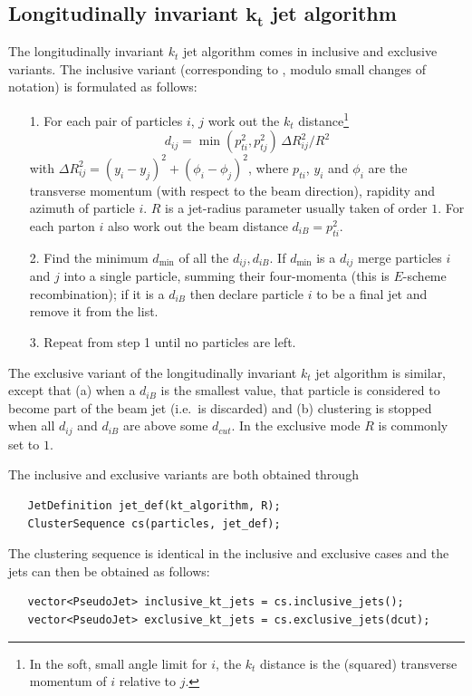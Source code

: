 \documentclass[12pt,a4]{article}
\begin{document}
\subsection[Longitudinally invariant $k_t$ jet algorithm]{Longitudinally invariant $\boldsymbol{k_t}$ jet algorithm}
%
The longitudinally invariant $k_t$ jet algorithm \cite{ktexcl,ktincl}
comes in inclusive and exclusive variants.
%
The inclusive variant (corresponding to \cite{ktincl}, modulo small
changes of notation) is formulated as follows:
\begin{itemize}
\item[1.] For each pair of particles $i$, $j$ work out the $k_t$
  distance\footnote{In the soft, small angle limit for $i$, the $k_t$
    distance is the (squared) transverse momentum of $i$ relative to $j$.}
  \begin{equation}
    \label{eq:dij}
    d_{ij} = \min(p_{ti}^2,{p_{tj}^2}) \, \Delta R_{ij}^2 / R^2
  \end{equation}
  with $\Delta R_{ij}^2 = (y_i-y_j)^2 + (\phi_i-\phi_j)^2$,
  where $p_{ti}$, $y_i$ and $\phi_i$ are the transverse momentum (with
  respect to the beam direction),
  rapidity and azimuth of particle $i$. $R$ is a jet-radius
  parameter usually taken of order $1$. For each parton $i$ also work
  out the beam distance $d_{iB} = p_{ti}^2$.
\item[2.] Find the minimum $d_{\min}$ of all the $d_{ij},d_{iB}$. If
  $d_{\min}$ is a $d_{ij}$ merge particles $i$ and $j$ into a single
  particle, summing their four-momenta (this is $E$-scheme
  recombination); if it is a $d_{iB}$ then declare particle $i$ to be
  a final jet and remove it from the list.
\item[3.] Repeat from step 1 until no particles are left.
\end{itemize}
The exclusive variant of the longitudinally invariant $k_t$ jet
algorithm \cite{ktexcl} is similar, except that (a) when a $d_{iB}$ is
the smallest value, that particle is considered to become part of the
beam jet (i.e.\ is discarded) and (b) clustering is stopped when all
$d_{ij}$ and $d_{iB}$ are above some $d_{cut}$. In the exclusive mode
$R$ is commonly set to $1$.

The inclusive and exclusive variants are both obtained through 
\begin{lstlisting}
   JetDefinition jet_def(kt_algorithm, R);
   ClusterSequence cs(particles, jet_def);
\end{lstlisting}
The clustering sequence is identical in the inclusive and exclusive
cases and the jets can then be obtained as follows:
\begin{lstlisting}
   vector<PseudoJet> inclusive_kt_jets = cs.inclusive_jets();
   vector<PseudoJet> exclusive_kt_jets = cs.exclusive_jets(dcut);
\end{lstlisting}
\end{document}
